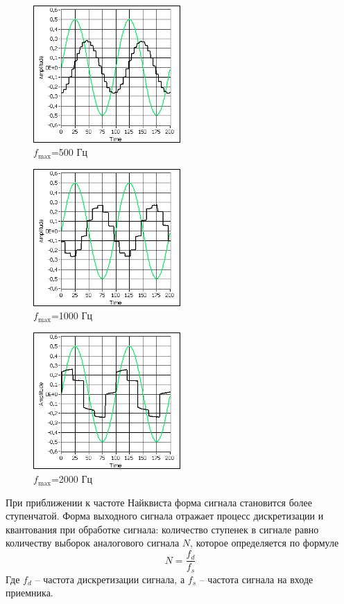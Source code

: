\documentclass[a4paper,14pt]{extarticle}
\begin{document}
\begin{figure}[H]
  \centering
  \includegraphics[width=0.5\textwidth]{Z4_FN4/signal_500.png}
  \caption{$f_{\max}$=500 Гц}
  \label{fig:}
\end{figure}
\begin{figure}[H]
  \centering
  \includegraphics[width=0.5\textwidth]{Z4_FN4/signal_1000.png}
  \caption{$f_{\max}$=1000 Гц}
  \label{fig:}
\end{figure}
\begin{figure}[H]
  \centering
  \includegraphics[width=0.5\textwidth]{Z4_FN4/signal_2000.png}
  \caption{$f_{\max}$=2000 Гц}
  \label{fig:}
\end{figure}

При приближении к частоте Найквиста форма сигнала становится более ступенчатой. Форма выходного сигнала отражает процесс дискретизации и квантования при обработке сигнала: количество ступенек в сигнале равно количеству выборок аналогового сигнала $N$, которое определяется по формуле
\begin{equation}
  N=\frac{f_d}{f_s}
\end{equation}
Где $f_d$ -- частота дискретизации сигнала, а $f_s$ -- частота сигнала на входе приемника.
\end{document}
